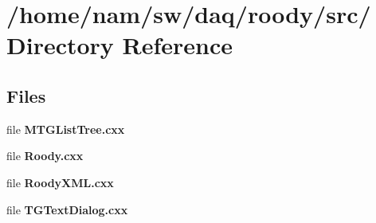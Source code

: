 \section{/home/nam/sw/daq/roody/src/ Directory Reference}
\label{dir_ffd95fa52d9bc5b54d53164b5d5f7e0b}
\subsection*{Files}
\begin{DoxyCompactItemize}
\item 
file {\bf MTGListTree.cxx}
\item 
file {\bf Roody.cxx}
\item 
file {\bf RoodyXML.cxx}
\item 
file {\bf TGTextDialog.cxx}
\end{DoxyCompactItemize}
